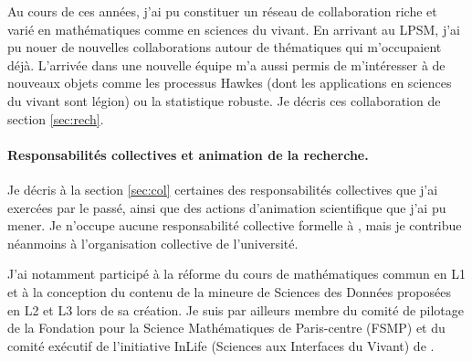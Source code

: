 \bigskip
Au cours de ces années, j’ai pu constituer un réseau de collaboration riche et varié en mathématiques comme en sciences du vivant. En arrivant au LPSM, j’ai pu nouer de nouvelles collaborations autour de thématiques qui m’occupaient déjà. L’arrivée dans une nouvelle équipe m’a aussi permis de m'intéresser à de nouveaux objets comme les processus Hawkes (dont les applications en sciences du vivant sont légion) ou la statistique robuste. Je décris ces collaboration de section \ref{sec:rech}.

\paragraph{Responsabilités collectives et animation de la recherche.}
Je décris à la section \ref{sec:col} certaines des responsabilités collectives que j’ai exercées par le passé, ainsi que des actions d’animation scientifique que j’ai pu mener. Je n’occupe aucune responsabilité collective formelle à \SU, mais je contribue néanmoins à l'organisation collective de l’université. 

J’ai notamment participé à la réforme du cours de mathématiques commun en L1 et à la conception du contenu de la mineure de Sciences des Données proposées en L2 et L3 lors de sa création. Je suis par ailleurs membre du comité de pilotage de la Fondation pour la Science Mathématiques de Paris-centre (FSMP) et du comité exécutif de l’initiative InLife (Sciences aux Interfaces du Vivant) de \SU. 



